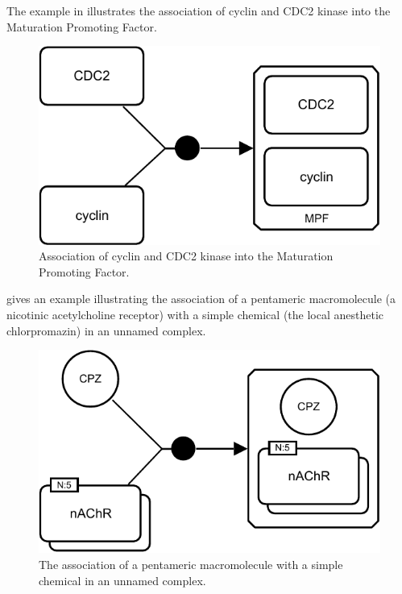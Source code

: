 The example in  illustrates the association of cyclin and CDC2 kinase into the Maturation Promoting Factor.

\begin{figure}[htb]
  \centering
  \includegraphics[scale = 0.3]{examples/association-MPF}
  \caption{Association of cyclin and CDC2 kinase into the Maturation Promoting Factor.}
  \label{fig:techref:assoc-cyclin}
\end{figure}

 gives an example illustrating the association of a pentameric macromolecule (a nicotinic acetylcholine receptor) with a simple chemical (the local anesthetic chlorpromazin) in an unnamed complex.

\begin{figure}[htb]
  \centering
  \includegraphics[scale = 0.3]{examples/association-unamed}
  \caption{The association of a pentameric macromolecule with a simple chemical in an unnamed complex.}
  \label{fig:techref:assoc-unamed}
\end{figure}

